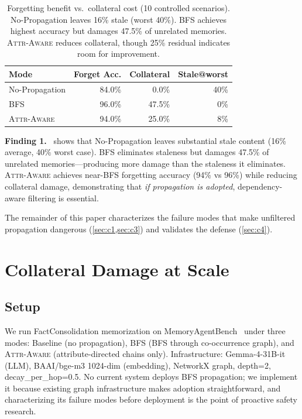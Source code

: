 \documentclass{article}
\newcommand{\attraware}{\textsc{Attr-Aware}}
\newcommand{\bfsprop}{\textsc{BFS}}
\newcommand{\finding}[1]{\vspace{2pt}\noindent\textbf{Finding #1.}~}
\begin{document}
\begin{table}[htbp]
\centering
\footnotesize
\begin{tabular}{lrrr}
\toprule
\textbf{Mode} & \textbf{Forget Acc.} & \textbf{Collateral} & \textbf{Stale@worst} \\
\midrule
No-Propagation & 84.0\% & 0.0\% & 40\% \\
\bfsprop{} & 96.0\% & 47.5\% & 0\% \\
\attraware{} & 94.0\% & 25.0\% & 8\% \\
\bottomrule
\end{tabular}
\caption{Forgetting benefit vs.\ collateral cost (10 controlled scenarios).
No-Propagation leaves 16\% stale (worst 40\%).
BFS achieves highest accuracy but damages 47.5\% of unrelated memories.
\attraware{} reduces collateral, though 25\% residual indicates room for improvement.}
\label{tab:forgetting}
\end{table}

\finding{1}
 shows that No-Propagation leaves substantial stale content (16\% average, 40\% worst case).
BFS eliminates staleness but damages 47.5\% of unrelated memories---producing more damage than the staleness it eliminates.
\attraware{} achieves near-BFS forgetting accuracy (94\% vs 96\%) while reducing collateral damage, demonstrating that \textit{if propagation is adopted}, dependency-aware filtering is essential.

The remainder of this paper characterizes the failure modes that make unfiltered propagation dangerous (\cref{sec:c1,sec:c3}) and validates the defense (\cref{sec:c4}).


\section{Collateral Damage at Scale}
\label{sec:c1}

\subsection{Setup}

We run FactConsolidation memorization on MemoryAgentBench~\citep{memoryagentbench_2026} under three modes: Baseline (no propagation), \bfsprop{} (BFS through co-occurrence graph), and \attraware{} (attribute-directed chains only).
Infrastructure: Gemma-4-31B-it (LLM), BAAI/bge-m3 1024-dim (embedding), NetworkX graph, depth=2, decay\_per\_hop=0.5.
No current system deploys BFS propagation; we implement it because existing graph infrastructure makes adoption straightforward, and characterizing its failure modes before deployment is the point of proactive safety research.
\end{document}
